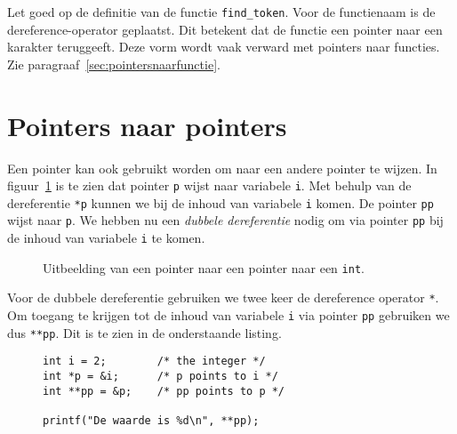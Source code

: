 Let goed op de definitie van de functie \texttt{find\_token}. Voor de functienaam is de dereference-operator geplaatst. Dit betekent dat de functie een pointer naar een karakter teruggeeft. Deze vorm wordt vaak verward met pointers naar functies. Zie paragraaf~\ref{sec:pointersnaarfunctie}.


\section{Pointers naar pointers}
\label{sec:pointersnaarpointers}
Een pointer kan ook gebruikt worden om naar een andere pointer te wijzen. In figuur~\ref{fig:poipointertopointer} is te zien dat pointer \texttt{p} wijst naar variabele \texttt{i}. Met behulp van de dereferentie \texttt{*p} kunnen we bij de inhoud van variabele \texttt{i} komen. De pointer \texttt{pp} wijst naar \texttt{p}. We hebben nu een \textsl{dubbele dereferentie} nodig om via pointer \texttt{pp} bij de inhoud van variabele \texttt{i} te komen. 

\begin{figure}[!ht]
\centering
{}
\caption{Uitbeelding van een pointer naar een pointer naar een \texttt{int}.}
\label{fig:poipointertopointer}
\end{figure}

Voor de dubbele dereferentie gebruiken we twee keer de dereference operator \texttt{*}. Om toegang te krijgen tot de inhoud van variabele \texttt{i} via pointer \texttt{pp} gebruiken we dus \texttt{**pp}. Dit is te zien in de onderstaande listing.

\begin{figure}[!ht]
\begin{lstlisting}[caption=Voorbeeld van een pointer naar een pointer.]
int i = 2;        /* the integer */
int *p = &i;      /* p points to i */
int **pp = &p;    /* pp points to p */

printf("De waarde is %d\n", **pp);
\end{lstlisting}
\end{figure}

